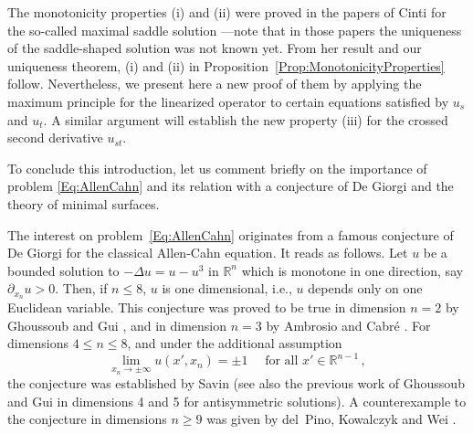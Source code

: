 \documentclass[twoside,leqno,symbols-for-thanks, draft]{rmi}
\numberwithin{equation}{section}
\theoremstyle{definition}
\newcommand{\con}[1]{\mathbb{#1}}
\newcommand{\R}{\con{R}} %
\begin{document}
The monotonicity properties (i) and (ii) were proved in the papers of Cinti \cite{Cinti-Saddle,Cinti-Saddle2} for the so-called maximal saddle solution ---note that in those papers the uniqueness of the saddle-shaped solution was not known yet. From her result and our uniqueness theorem, (i) and (ii) in Proposition~\ref{Prop:MonotonicityProperties} follow. Nevertheless, we present here a new proof of them by applying the maximum principle for the linearized operator to certain equations satisfied by $u_s$ and $u_t$. A similar argument will establish the new property (iii) for the crossed second derivative $u_{st}$. 

To conclude this introduction, let us comment briefly on the importance of problem \eqref{Eq:AllenCahn} and its relation with a conjecture of De Giorgi and the theory of minimal surfaces.

The interest on problem~\eqref{Eq:AllenCahn} originates from a famous conjecture of De Giorgi for the classical Allen-Cahn equation. It reads as follows. Let $u$ be a bounded solution to $-\Delta  u = u - u^3 $ in $\R^n$ which is monotone in one direction, say $\partial_{x_n} u > 0$. Then, if $n\leq 8$, $u$ is one dimensional, i.e., $u$ depends only on one Euclidean variable. This conjecture was proved to be true in dimension $n=2$ by Ghoussoub and Gui \cite{GhoussoubGui}, and in dimension $n=3$ by Ambrosio and Cabr\'e \cite{AmbrosioCabre}. For dimensions $4\leq n \leq 8$, and under the additional assumption 
\begin{equation}
\label{Eq:SavinCondition}
\lim_{x_n \to \pm \infty} u(x',x_n) = \pm 1 \quad \text{ for all } x'\in \R^{n-1}\,,
\end{equation}
the conjecture was established by Savin \cite{Savin-DeGiorgi} (see also the previous work of Ghoussoub and Gui \cite{GhoussoubGui-odd} in dimensions 4 and 5 for antisymmetric solutions). A counterexample to the conjecture in dimensions $n \geq 9$ was given by del~Pino, Kowalczyk and Wei \cite{delPinoKowalczykWei}. 
\end{document}
